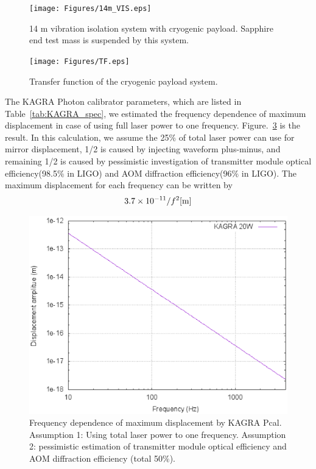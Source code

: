 \begin{figure}
\begin{center}
\texttt{[image: Figures/14m\_VIS.eps]}
\caption{14 m vibration isolation system with cryogenic payload. Sapphire end test mass is suspended by this system.  } 
\label{fig:14m_VIS} 
\end{center}
\end{figure}
\begin{figure}
\begin{center}
\texttt{[image: Figures/TF.eps]}
\caption{Transfer function of the cryogenic payload system. } 
\label{fig:TF} 
\end{center}
\end{figure}
The KAGRA Photon calibrator parameters, which are listed in Table~\ref{tab:KAGRA_spec}, we estimated the frequency dependence of maximum displacement 
in case of using full laser power to one frequency. 
Figure.~\ref{fig:kagra_pcal_displacement} is the result.
In this calculation, we assume the 25$\%$ of total laser power can use for mirror displacement, 
1/2 is caused by injecting waveform plus-minus, 
and remaining 1/2 is caused by pessimistic investigation of 
transmitter module optical efficiency(98.5$\%$ in LIGO) and
AOM diffraction efficiency(96$\%$ in LIGO).
The maximum displacement for each frequency can be written by 
\begin{equation}
3.7 \times 10^{-11}/f^2 {\rm   [m]}
\end{equation}

\begin{figure}
\begin{center}
\includegraphics[width=15cm]{Figures/pcal_disp.eps}
\caption{Frequency dependence of maximum displacement by KAGRA Pcal. 
Assumption 1: Using total laser power to one frequency.
Assumption 2: pessimistic estimation of transmitter module optical efficiency and 
AOM diffraction efficiency (total 50$\%$). }
\label{fig:kagra_pcal_displacement} 
\end{center}
\end{figure}



